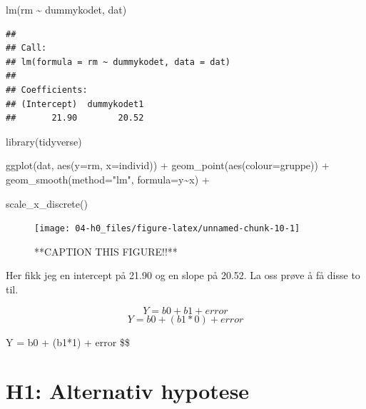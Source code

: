 \documentclass[
]{book}
\newenvironment{Shaded}{\begin{snugshade}}{\end{snugshade}}
\newcommand{\AttributeTok}[1]{\textcolor[rgb]{0.77,0.63,0.00}{#1}}
\newcommand{\FunctionTok}[1]{\textcolor[rgb]{0.00,0.00,0.00}{#1}}
\newcommand{\NormalTok}[1]{#1}
\newcommand{\SpecialCharTok}[1]{\textcolor[rgb]{0.00,0.00,0.00}{#1}}
\newcommand{\StringTok}[1]{\textcolor[rgb]{0.31,0.60,0.02}{#1}}
\begin{document}
\begin{Shaded}
\begin{Highlighting}[]
\FunctionTok{lm}\NormalTok{(rm }\SpecialCharTok{\textasciitilde{}}\NormalTok{ dummykodet, dat)}
\end{Highlighting}
\end{Shaded}

\begin{verbatim}
## 
## Call:
## lm(formula = rm ~ dummykodet, data = dat)
## 
## Coefficients:
## (Intercept)  dummykodet1  
##       21.90        20.52
\end{verbatim}

\begin{Shaded}
\begin{Highlighting}[]
\FunctionTok{library}\NormalTok{(tidyverse)}



\FunctionTok{ggplot}\NormalTok{(dat, }\FunctionTok{aes}\NormalTok{(}\AttributeTok{y=}\NormalTok{rm, }\AttributeTok{x=}\NormalTok{individ)) }\SpecialCharTok{+} 
  \FunctionTok{geom\_point}\NormalTok{(}\FunctionTok{aes}\NormalTok{(}\AttributeTok{colour=}\NormalTok{gruppe)) }\SpecialCharTok{+}
  \FunctionTok{geom\_smooth}\NormalTok{(}\AttributeTok{method=}\StringTok{"lm"}\NormalTok{, }\AttributeTok{formula=}\NormalTok{y}\SpecialCharTok{\textasciitilde{}}\NormalTok{x) }\SpecialCharTok{+}
  
  \FunctionTok{scale\_x\_discrete}\NormalTok{()}
\end{Highlighting}
\end{Shaded}

\begin{figure}

{\centering \texttt{[image: 04-h0\_files/figure-latex/unnamed-chunk-10-1]} 

}

\caption{**CAPTION THIS FIGURE!!**}\label{fig:unnamed-chunk-10}
\end{figure}

Her fikk jeg en intercept på 21.90 og en slope på 20.52. La oss prøve å få disse to til.

\[
Y = b0 + b1 + error
\]
\[
Y = b0 + (b1*0) + error
\]

\[
\]
Y = b0 + (b1*1) + error
\$\$

\hypertarget{h1-alternativ-hypotese-1}{%
\chapter{H1: Alternativ hypotese}\label{h1-alternativ-hypotese-1}}
\end{document}
